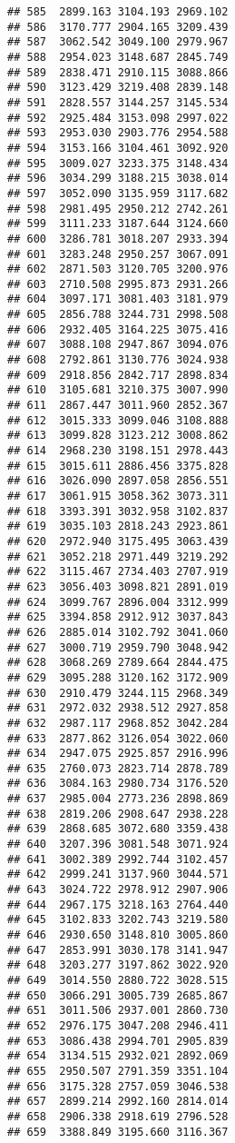 \documentclass[
]{article}
\begin{document}
\begin{verbatim}
## 585  2899.163 3104.193 2969.102
## 586  3170.777 2904.165 3209.439
## 587  3062.542 3049.100 2979.967
## 588  2954.023 3148.687 2845.749
## 589  2838.471 2910.115 3088.866
## 590  3123.429 3219.408 2839.148
## 591  2828.557 3144.257 3145.534
## 592  2925.484 3153.098 2997.022
## 593  2953.030 2903.776 2954.588
## 594  3153.166 3104.461 3092.920
## 595  3009.027 3233.375 3148.434
## 596  3034.299 3188.215 3038.014
## 597  3052.090 3135.959 3117.682
## 598  2981.495 2950.212 2742.261
## 599  3111.233 3187.644 3124.660
## 600  3286.781 3018.207 2933.394
## 601  3283.248 2950.257 3067.091
## 602  2871.503 3120.705 3200.976
## 603  2710.508 2995.873 2931.266
## 604  3097.171 3081.403 3181.979
## 605  2856.788 3244.731 2998.508
## 606  2932.405 3164.225 3075.416
## 607  3088.108 2947.867 3094.076
## 608  2792.861 3130.776 3024.938
## 609  2918.856 2842.717 2898.834
## 610  3105.681 3210.375 3007.990
## 611  2867.447 3011.960 2852.367
## 612  3015.333 3099.046 3108.888
## 613  3099.828 3123.212 3008.862
## 614  2968.230 3198.151 2978.443
## 615  3015.611 2886.456 3375.828
## 616  3026.090 2897.058 2856.551
## 617  3061.915 3058.362 3073.311
## 618  3393.391 3032.958 3102.837
## 619  3035.103 2818.243 2923.861
## 620  2972.940 3175.495 3063.439
## 621  3052.218 2971.449 3219.292
## 622  3115.467 2734.403 2707.919
## 623  3056.403 3098.821 2891.019
## 624  3099.767 2896.004 3312.999
## 625  3394.858 2912.912 3037.843
## 626  2885.014 3102.792 3041.060
## 627  3000.719 2959.790 3048.942
## 628  3068.269 2789.664 2844.475
## 629  3095.288 3120.162 3172.909
## 630  2910.479 3244.115 2968.349
## 631  2972.032 2938.512 2927.858
## 632  2987.117 2968.852 3042.284
## 633  2877.862 3126.054 3022.060
## 634  2947.075 2925.857 2916.996
## 635  2760.073 2823.714 2878.789
## 636  3084.163 2980.734 3176.520
## 637  2985.004 2773.236 2898.869
## 638  2819.206 2908.647 2938.228
## 639  2868.685 3072.680 3359.438
## 640  3207.396 3081.548 3071.924
## 641  3002.389 2992.744 3102.457
## 642  2999.241 3137.960 3044.571
## 643  3024.722 2978.912 2907.906
## 644  2967.175 3218.163 2764.440
## 645  3102.833 3202.743 3219.580
## 646  2930.650 3148.810 3005.860
## 647  2853.991 3030.178 3141.947
## 648  3203.277 3197.862 3022.920
## 649  3014.550 2880.722 3028.515
## 650  3066.291 3005.739 2685.867
## 651  3011.506 2937.001 2860.730
## 652  2976.175 3047.208 2946.411
## 653  3086.438 2994.701 2905.839
## 654  3134.515 2932.021 2892.069
## 655  2950.507 2791.359 3351.104
## 656  3175.328 2757.059 3046.538
## 657  2899.214 2992.160 2814.014
## 658  2906.338 2918.619 2796.528
## 659  3388.849 3195.660 3116.367

\end{verbatim}
\end{document}
